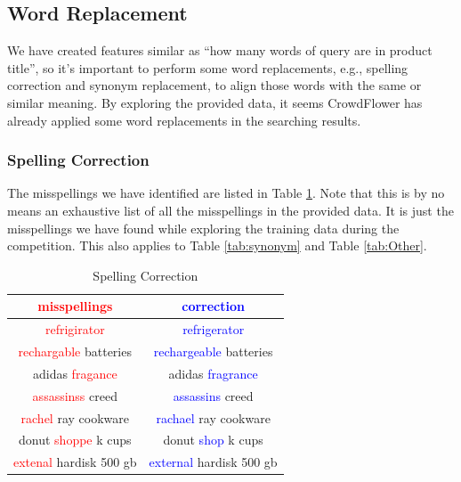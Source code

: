 \documentclass[12pt]{article}
\begin{document}
\subsection{Word Replacement}
We have created features similar as ``how many words of query are in product title'', so it's important to perform some word replacements, e.g., spelling correction and synonym replacement, to align those words with the same or similar meaning. By exploring the provided data, it seems CrowdFlower has already applied some word replacements in the searching results.

\subsubsection{Spelling Correction}
The misspellings we have identified are listed in Table \ref{tab:spelling_correction}. Note that this is by no means an exhaustive list of all the misspellings in the provided data. It is just the misspellings we have found while exploring the training data during the competition. This also applies to Table \ref{tab:synonym} and Table \ref{tab:Other}.
\begin{table}[!htb]
\centering
\caption{Spelling Correction}
\label{tab:spelling_correction}
\begin{tabular}{|c|c|}
\hline
\textcolor{red}{misspellings} & \textcolor{blue}{correction} \\
\hline\hline
\textcolor{red}{refrigirator} & \textcolor{blue}{refrigerator} \\
\textcolor{red}{rechargable} batteries & \textcolor{blue}{rechargeable} batteries \\
adidas \textcolor{red}{fragance} & adidas \textcolor{blue}{fragrance}\\
\textcolor{red}{assassinss} creed & \textcolor{blue}{assassins} creed\\
\textcolor{red}{rachel} ray cookware & \textcolor{blue}{rachael} ray cookware \\
donut \textcolor{red}{shoppe} k cups & donut \textcolor{blue}{shop} k cups \\
\textcolor{red}{extenal} hardisk 500 gb & \textcolor{blue}{external} hardisk 500 gb \\
\hline
\end{tabular}
\end{table}
\end{document}
